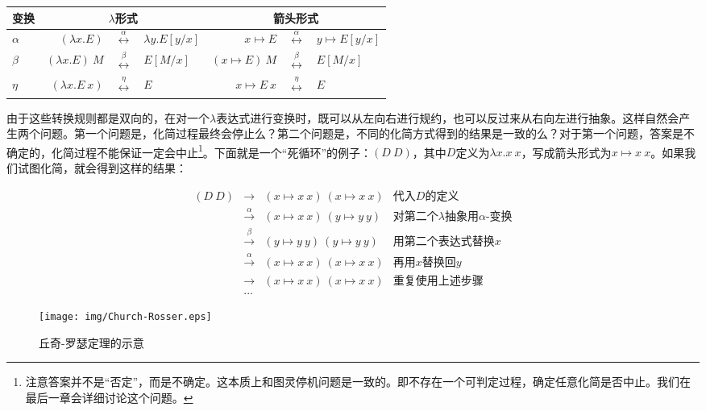 \documentclass{article}
\begin{document}
\begin{tabular}{|l|rcl|rcl|}
\hline
变换 & \multicolumn{3}{|c|}{$\lambda$形式} & \multicolumn{3}{|c|}{箭头形式} \\
\hline
$\alpha$ & $(\lambda x . E)$ & $\overset{\alpha}{\longleftrightarrow}$ & $\lambda y . E[y/x]$
         & $x \mapsto E$ & $\overset{\alpha}{\longleftrightarrow}$ & $y \mapsto E[y/x]$ \\
\hline
$\beta$  & $(\lambda x . E)\ M$ & $\overset{\beta}{\longleftrightarrow}$ & $E[M/x]$
         & $(x \mapsto E)\ M$ & $\overset{\beta}{\longleftrightarrow}$ & $E[M/x]$ \\
\hline
$\eta$   & $(\lambda x . E\ x)$ & $\overset{\eta}{\longleftrightarrow}$ & $E$
         & $x \mapsto E\ x$ & $\overset{\eta}{\longleftrightarrow}$ & $E$ \\
\hline
\end{tabular}

由于这些转换规则都是双向的，在对一个$\lambda$表达式进行变换时，既可以从左向右进行规约，也可以反过来从右向左进行抽象。这样自然会产生两个问题。第一个问题是，化简过程最终会停止么？第二个问题是，不同的化简方式得到的结果是一致的么？对于第一个问题，答案是不确定的，化简过程不能保证一定会中止\footnote{注意答案并不是“否定”，而是不确定。这本质上和图灵停机问题是一致的。即不存在一个可判定过程，确定任意化简是否中止。我们在最后一章会详细讨论这个问题。}。下面就是一个“死循环”的例子：$(D\ D)$，其中$D$定义为$\lambda x. x\ x$，写成箭头形式为$x \mapsto x\ x$。如果我们试图化简，就会得到这样的结果：

\[
\begin{array}{rcll}
(D\ D) & \to & (x \mapsto x\ x)\ (x \mapsto x\ x) & \text{代入$D$的定义} \\
       & \xrightarrow{\alpha} & (x \mapsto x\ x)\ (y \mapsto y\ y) & \text{对第二个$\lambda$抽象用$\alpha$-变换} \\
       & \xrightarrow{\beta} & (y \mapsto y\ y)\ (y \mapsto y\ y) & \text{用第二个表达式替换$x$} \\
       & \xrightarrow{\alpha} & (x \mapsto x\ x)\ (x \mapsto x\ x) & \text{再用$x$替换回$y$} \\
       & \to & (x \mapsto x\ x)\ (x \mapsto x\ x) & \text{重复使用上述步骤} \\
       & ... &
\end{array}
\]

\begin{wrapfigure}{R}{0.3\textwidth}
 \centering
 \texttt{[image: img/Church-Rosser.eps]}
 \caption{丘奇-罗瑟定理的示意}
 \label{fig:Church-Rosser-confluence}
\end{wrapfigure}
\end{document}
